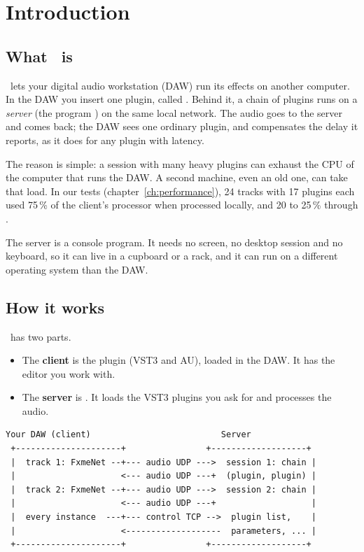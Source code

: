 \chapter{Introduction}
\label{ch:intro}

\section{What \fxme\ is}

\fxme\ lets your digital audio workstation (DAW) run its effects on another
computer. In the DAW you insert one plugin, called . Behind it,
a chain of plugins runs on a \emph{server} (the program
) on the same local network. The audio goes to the
server and comes back; the DAW sees one ordinary plugin, and compensates the
delay it reports, as it does for any plugin with latency.

The reason is simple: a session with many heavy plugins can exhaust the CPU
of the computer that runs the DAW. A second machine, even an old one, can
take that load. In our tests (chapter~\ref{ch:performance}), 24 tracks with
17 plugins each used 75\,\% of the client's processor when processed
locally, and 20 to 25\,\% through \fxme.

The server is a console program. It needs no screen, no desktop session and
no keyboard, so it can live in a cupboard or a rack, and it can run on a
different operating system than the DAW.

\section{How it works}

\fxme\ has two parts.

\begin{itemize}
  \item The \textbf{client} is the  plugin (VST3 and AU), loaded
    in the DAW. It has the editor you work with.
  \item The \textbf{server} is . It loads the VST3
    plugins you ask for and processes the audio.
\end{itemize}

\begin{lstlisting}[language={}]
   Your DAW (client)                          Server
 +---------------------+                +-------------------+
 |  track 1: FxmeNet --+--- audio UDP --->  session 1: chain |
 |                     <--- audio UDP ---+  (plugin, plugin) |
 |  track 2: FxmeNet --+--- audio UDP --->  session 2: chain |
 |                     <--- audio UDP ---+                   |
 |  every instance  ---+--- control TCP -->  plugin list,    |
 |                     <-------------------  parameters, ... |
 +---------------------+                +-------------------+
\end{lstlisting}

